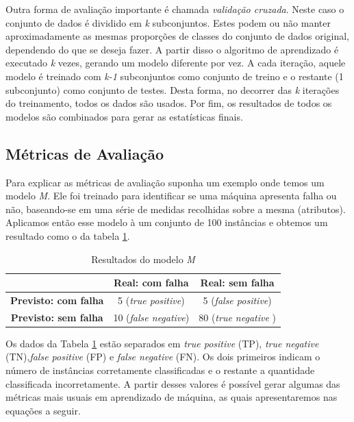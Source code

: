 Outra forma de avaliação importante é chamada \textit{validação cruzada}.
Neste caso o conjunto de dados é dividido em \textit{k} subconjuntos.
Estes podem ou não manter aproximadamente as mesmas proporções de classes do conjunto de dados original, dependendo do que se deseja fazer.
A partir disso o algoritmo de aprendizado é executado \textit{k} vezes, gerando um modelo diferente por vez.
A cada iteração, aquele modelo é treinado com \textit{k-1} subconjuntos como conjunto de treino e o restante (1 subconjunto) como conjunto de testes.
Desta forma, no decorrer das \textit{k} iterações do treinamento, todos os dados são usados.
Por fim, os resultados de todos os modelos são combinados para gerar as estatísticas finais.

\subsection{Métricas de Avaliação}

Para explicar as métricas de avaliação suponha um exemplo onde temos um modelo \textit{M}.
Ele foi treinado para identificar se uma máquina apresenta falha ou não, baseando-se em uma série de medidas recolhidas sobre a mesma (atributos).
Aplicamos então esse modelo à um conjunto de 100 instâncias e obtemos um resultado como o da tabela \ref{tab:positivosenegativos}.

\begin{table}[h!]
  \begin{center}
    \begin{tabular}{ccc}
      \hline
        & \textbf{Real: com falha} & \textbf{Real: sem falha} \\
      \hline

      \textbf{Previsto: com falha} & 5 (\textit{true positive}) & 5 (\textit{false positive}) \\
      \textbf{Previsto: sem falha} & 10 (\textit{false negative}) & 80 (\textit{true negative} )\\

      \hline
    \end{tabular}
    \caption{Resultados do modelo \textit{M}}
    \label{tab:positivosenegativos}
  \end{center}
\end{table}

Os dados da Tabela \ref{tab:positivosenegativos} estão separados em \textit{true positive} (TP), \textit{true negative} (TN),\textit{false positive} (FP) e \textit{false negative} (FN).
Os dois primeiros indicam o número de instâncias corretamente classificadas e o restante a quantidade classificada incorretamente.
A partir desses valores é possível gerar algumas das métricas mais usuais em aprendizado de máquina, as quais apresentaremos nas equações a seguir.

